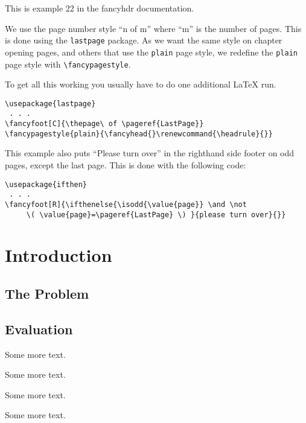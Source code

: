 \documentclass[openany]{book}
\begin{document}
\tableofcontents
\bigskip

\noindent
\begin{boxedminipage}{\textwidth}
This is example 22 in the fancyhdr documentation.

We use the page number style ``n of m'' where ``m'' is the number of pages. This is done using the \texttt{lastpage} package. As we want the same style on chapter opening pages, and others that use the \texttt{plain} page style, we redefine the \texttt{plain} page style with \verb|\fancypagestyle|.

To get all this working you usually have to do one additional \LaTeX{} run.

\begin{verbatim}
\usepackage{lastpage}
 . . .
\fancyfoot[C]{\thepage\ of \pageref{LastPage}}
\fancypagestyle{plain}{\fancyhead{}\renewcommand{\headrule}{}}
\end{verbatim}

This example also puts  ``Please turn over'' in the righthand side footer on odd pages, except the last page. This is done with the following code:

\begin{verbatim}
\usepackage{ifthen}
 . . . 
\fancyfoot[R]{\ifthenelse{\isodd{\value{page}} \and \not
     \( \value{page}=\pageref{LastPage} \) }{please turn over}{}}
\end{verbatim}
\end{boxedminipage}

\chapter{Introduction}

\lipsum

\section{The Problem}
\label{sec:problem}

\lipsum[1]

\section{Evaluation}

\lipsum

Some more text.

Some more text.

Some more text.

Some more text.
\end{document}
